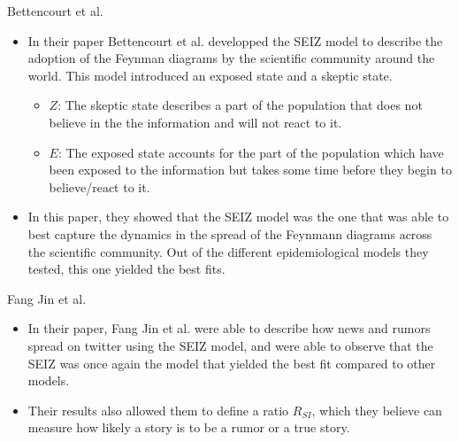 \documentclass{beamer}
\begin{document}
\begin{frame}{Bettencourt et al.}
  \begin{itemize}
  \item {
    In their paper Bettencourt et al. developped the SEIZ model to describe the adoption of the Feynman diagrams by the scientific community around the world. This model introduced an exposed state and a skeptic state.
    {\begin{itemize}
        \item $Z$: The skeptic state describes a part of the population that does not believe in the the information and will not react to it.
        \item $E$: The exposed state accounts for the part of the population which have been exposed to the information but takes some time before they begin to believe/react to it.
    \end{itemize}}
    \pause %
  }
  \item {In this paper, they showed that the SEIZ model was the one that was able to best capture the dynamics in the spread of the Feynmann diagrams across the scientific community. Out of the different epidemiological models they tested, this one yielded the best fits.
   }
  \end{itemize}
\end{frame}

\begin{frame}{Fang Jin et al.}
    \begin{itemize}
        \item {In their paper, Fang Jin et al. were able to describe how news and rumors spread on twitter using the SEIZ model, and were able to observe that the SEIZ was once again the model that yielded the best fit compared to other models. 
        \pause %
        }
        \item Their results also allowed them to define a ratio $R_{SI}$, which they believe can measure how likely a story is to be a rumor or a true story.
    \end{itemize}
\end{frame}
\end{document}
